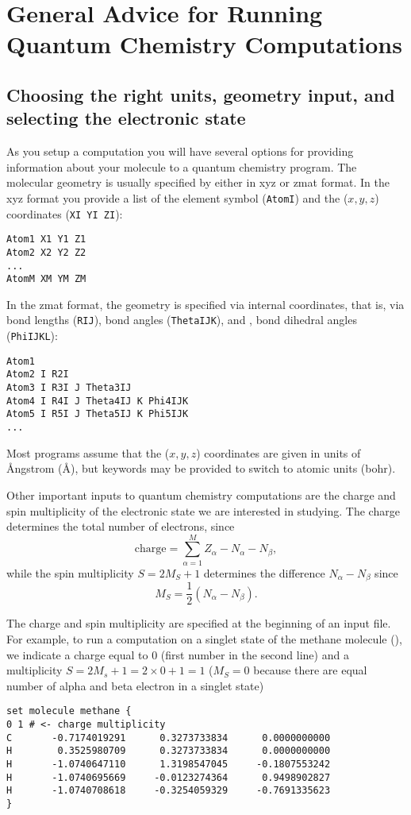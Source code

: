 \documentclass[../Main/chem532-notes.tex]{subfiles}
\begin{document}
\setcounter{chapter}{8}

\chapter{General Advice for Running Quantum Chemistry Computations}

\section{Choosing the right units, geometry input, and selecting the electronic state}

As you setup a computation you will have several options for providing information about your molecule to a quantum chemistry program.
The molecular geometry is usually specified by either in xyz or zmat format. In the xyz format you provide a list of the element symbol (\verb|AtomI|) and the ($x, y,z$) coordinates (\verb|XI YI ZI|):
\begin{verbatim}
Atom1 X1 Y1 Z1
Atom2 X2 Y2 Z2
...
AtomM XM YM ZM
\end{verbatim}
In the zmat format, the geometry is specified via internal coordinates, that is, via bond lengths (\verb|RIJ|), bond angles (\verb|ThetaIJK|), and , bond dihedral angles (\verb|PhiIJKL|):
\begin{verbatim}
Atom1
Atom2 I R2I 
Atom3 I R3I J Theta3IJ
Atom4 I R4I J Theta4IJ K Phi4IJK
Atom5 I R5I J Theta5IJ K Phi5IJK
...
\end{verbatim}
Most programs assume that the ($x,y,z$) coordinates are given in units of \AA{}ngstrom (\AA{}), but keywords may be provided to switch to atomic units (bohr).

Other important inputs to quantum chemistry computations are the charge and spin multiplicity of the electronic state we are interested in studying.
The charge determines the total number of electrons, since
\begin{equation}
\mathrm{charge} = \sum_{\alpha=1}^M Z_\alpha - N_\alpha - N_\beta,
\end{equation}
while the spin multiplicity $S = 2 M_S + 1$ determines the difference $N_\alpha - N_\beta$ since
\begin{equation}
M_S = \frac{1}{2} (N_\alpha - N_\beta).
\end{equation}

The charge and spin multiplicity are specified at the beginning of an input file. For example, to run a computation on a singlet state of the methane molecule (), we indicate a charge equal to 0 (first number in the second line) and a multiplicity $S= 2M_s + 1 = 2 \times 0 + 1 = 1$ ($M_S = 0$ because there are equal number of alpha and beta electron in a singlet state)
\begin{verbatim}
set molecule methane {
0 1 # <- charge multiplicity
C       -0.7174019291      0.3273733834      0.0000000000                 
H        0.3525980709      0.3273733834      0.0000000000                 
H       -1.0740647110      1.3198547045     -0.1807553242                 
H       -1.0740695669     -0.0123274364      0.9498902827                 
H       -1.0740708618     -0.3254059329     -0.7691335623     
}
\end{verbatim}
\end{document}
